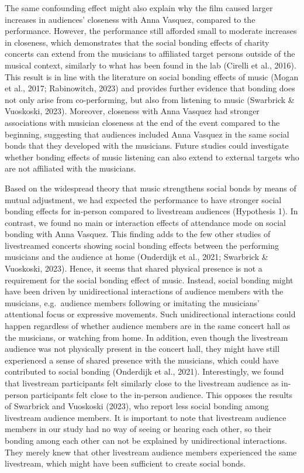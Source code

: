 \documentclass[
  man,floatsintext]{apa6}
\begin{document}
The same confounding effect might also explain why the film caused larger increases in audiences' closeness with Anna Vasquez, compared to the performance. However, the performance still afforded small to moderate increases in closeness, which demonstrates that the social bonding effects of charity concerts can extend from the musicians to affiliated target persons outside of the musical context, similarly to what has been found in the lab (Cirelli et al., 2016). This result is in line with the literature on social bonding effects of music (Mogan et al., 2017; Rabinowitch, 2023) and provides further evidence that bonding does not only arise from co-performing, but also from listening to music (Swarbrick \& Vuoskoski, 2023). Moreover, closeness with Anna Vasquez had stronger associations with musician closeness at the end of the event compared to the beginning, suggesting that audiences included Anna Vasquez in the same social bonds that they developed with the musicians. Future studies could investigate whether bonding effects of music listening can also extend to external targets who are not affiliated with the musicians.

Based on the widespread theory that music strengthens social bonds by means of mutual adjustment, we had expected the performance to have stronger social bonding effects for in-person compared to livestream audiences (Hypothesis 1). In contrast, we found no main or interaction effects of attendance mode on social bonding with Anna Vasquez. This finding adds to the few other studies of livestreamed concerts showing social bonding effects between the performing musicians and the audience at home (Onderdijk et al., 2021; Swarbrick \& Vuoskoski, 2023). Hence, it seems that shared physical presence is not a requirement for the social bonding effect of music. Instead, social bonding might have been driven by unidirectional interactions of audience members with the musicians, e.g.~audience members following or imitating the musicians' attentional focus or expressive movements. Such unidirectional interactions could happen regardless of whether audience members are in the same concert hall as the musicians, or watching from home. In addition, even though the livestream audience was not physically present in the concert hall, they might have still experienced a sense of shared presence with the musicians, which could have contributed to social bonding (Onderdijk et al., 2021). Interestingly, we found that livestream participants felt similarly close to the livestream audience as in-person participants felt close to the in-person audience. This opposes the results of Swarbrick and Vuoskoski (2023), who report less social bonding among livestream audience members. It is important to note that livestream audience members in our study had no way of seeing or hearing each other, so their bonding among each other can not be explained by unidirectional interactions. They merely knew that other livestream audience members experienced the same livestream, which might have been sufficient to create social bonds.
\end{document}
